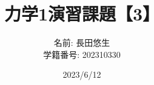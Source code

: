 \documentclass[dvipdfmx,uplatex]{jsarticle}
\title{力学1演習課題【3】}
\author{
    名前: 長田悠生\\
    学籍番号: 202310330\\
}
\date{2023/6/12}
\begin{document}
  \begin{titlepage}
    \maketitle
    \begin{center}
      \textmc{\HUGE \LaTeX}
    \end{center}
    \thispagestyle{empty}
  \end{titlepage}
\end{document}

